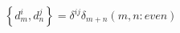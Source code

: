 \begin{equation}
\left\{d_{m}^{i}, d_{n}^{j}\right\}=\delta^{ij}\delta_{m+n} (m,n:
even)
\end{equation}


